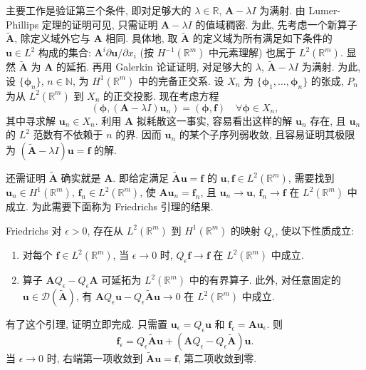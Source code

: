 主要工作是验证第三个条件, 即对足够大的 $\lambda\in\mathbb{R}$, $\bm{A}-\lambda I$ 为满射. 由 Lumer-Phillips 定理的证明可见, 只需证明 $\bm{A}-\lambda I$ 的值域稠密. 为此, 先考虑一个新算子 $\widetilde{\bm{A}}$, 除定义域外它与 $\bm{A}$ 相同. 具体地, 取 $\widetilde{\bm{A}}$ 的定义域为所有满足如下条件的 $\bm{u}\in L^2$ 构成的集合: $\bm{A}^i\partial\bm{u}/\partial x_i$ (按 $H^{-1}(\mathbb{R}^m)$ 中元素理解) 也属于 $L^2(\mathbb{R}^m)$. 显然 $\widetilde{\bm{A}}$ 为 $\bm{A}$ 的延拓. 再用 Galerkin 论证证明, 对足够大的 $\lambda$, $\widetilde{\bm{A}}-\lambda I$ 为满射. 为此, 设 $\{\bm{\phi}_n\}$, $n\in\mathbb{N}$, 为 $H^1(\mathbb{R}^m)$ 中的完备正交系. 设 $X_n$ 为 $\{\bm{\phi}_1,\ldots,\bm{\phi}_n\}$ 的张成, $P_n$ 为从 $L^2(\mathbb{R}^m)$ 到 $X_n$ 的正交投影. 现在考虑方程
\begin{equation}\label{eq:symmetric-hyperbolic-resolvent-galerkin-equation}
(\bm{\phi},(\bm{A}-\lambda I)\bm{u}_n)=(\bm{\phi},\bm{f})\quad\forall\bm{\phi}\in X_n,
\end{equation}
其中寻求解 $\bm{u}_n\in X_n$. 利用 $\bm{A}$ 拟耗散这一事实, 容易看出这样的解 $\bm{u}_n$ 存在, 且 $\bm{u}_n$ 的 $L^2$ 范数有不依赖于 $n$ 的界. 因而 $\bm{u}_n$ 的某个子序列弱收敛, 且容易证明其极限为 $(\widetilde{\bm{A}}-\lambda I)\bm{u}=\bm{f}$ 的解.\par 还需证明 $\widetilde{\bm{A}}$ 确实就是 $\bm{A}$. 即给定满足 $\widetilde{\bm{A}}\bm{u}=\bm{f}$ 的 $\bm{u},\bm{f}\in L^2(\mathbb{R}^m)$, 需要找到 $\bm{u}_n\in H^1(\mathbb{R}^m)$, $\bm{f}_n\in L^2(\mathbb{R}^m)$, 使 $\bm{A}\bm{u}_n=\bm{f}_n$, 且 $\bm{u}_n\to\bm{u}$, $\bm{f}_n\to\bm{f}$ 在 $L^2(\mathbb{R}^m)$ 中成立. 为此需要下面称为 Friedrichs 引理的结果.

\begin{Lemma}{Friedrichs}
\label{lem:friedrichs-commutator-approximation}
对 $\epsilon>0$, 存在从 $L^2(\mathbb{R}^m)$ 到 $H^1(\mathbb{R}^m)$ 的映射 $Q_\epsilon$, 使以下性质成立:\begin{enumerate}\item 对每个 $\bm{f}\in L^2(\mathbb{R}^m)$, 当 $\epsilon\to0$ 时, $Q_\epsilon\bm{f}\to\bm{f}$ 在 $L^2(\mathbb{R}^m)$ 中成立.\item 算子 $\bm{A}Q_\epsilon-Q_\epsilon\bm{A}$ 可延拓为 $L^2(\mathbb{R}^m)$ 中的有界算子. 此外, 对任意固定的 $\bm{u}\in\mathcal{D}(\widetilde{\bm{A}})$, 有 $\bm{A}Q_\epsilon\bm{u}-Q_\epsilon\widetilde{\bm{A}}\bm{u}\to0$ 在 $L^2(\mathbb{R}^m)$ 中成立.\end{enumerate}
\end{Lemma}

有了这个引理, 证明立即完成. 只需置 $\bm{u}_\epsilon=Q_\epsilon\bm{u}$ 和 $\bm{f}_\epsilon=\bm{A}\bm{u}_\epsilon$. 则
\begin{equation}\label{eq:symmetric-hyperbolic-friedrichs-graph-approximation}
\bm{f}_\epsilon=Q_\epsilon\widetilde{\bm{A}}\bm{u}+(\bm{A}Q_\epsilon-Q_\epsilon\widetilde{\bm{A}})\bm{u}.
\end{equation}
当 $\epsilon\to0$ 时, 右端第一项收敛到 $\widetilde{\bm{A}}\bm{u}=\bm{f}$, 第二项收敛到零.

